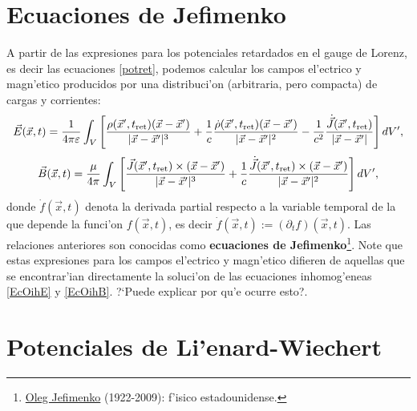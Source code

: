 \section{Ecuaciones de Jefimenko}
A partir de las expresiones para los potenciales retardados en el gauge de Lorenz, es decir las ecuaciones \eqref{potret}, podemos calcular los campos el'ectrico y magn'etico producidos por una distribuci'on (arbitraria, pero compacta) de cargas y corrientes:
\begin{equation}
\vec{E}(\vec{x},t)=\frac{1}{4\pi\varepsilon}\int_V \left[  \frac{\rho(\vec{x}',t_{\rm ret})(\vec{x}-\vec{x}')}{\vert \vec{x}-\vec{x}' \vert^3} + \frac{1}{c}\frac{ \dot\rho(\vec{x}',t_{\rm ret})(\vec{x}-\vec{x}')}{\vert\vec{x}-\vec{x}'\vert^2} -\frac{1}{c^2}\frac{\dot{\vec{J}} (\vec{x}',t_{\rm ret})}{\vert\vec{x}-\vec{x}' \vert} \right] dV',
\end{equation}
\begin{equation}
\vec{B}(\vec{x},t)=\frac{\mu}{4\pi} \int_V\left[
\frac{\vec{J}(\vec{x}',t_{\rm ret})\times(\vec{x}-\vec{x}')}{\vert \vec{x}-\vec{x}'\vert^3}+ \frac{1}{c}\frac{ \dot{\vec{J}}(\vec{x}',t_{\rm ret})\times(\vec{x}-\vec{x}')}{\vert\vec{x}-\vec{x}' \vert^2} \right]dV', \label{b3}
\end{equation}
donde $\dot{f}(\vec{x},t)$ denota la derivada partial respecto a la variable temporal de la que depende la funci'on $f(\vec{x},t)$, es decir $\dot{f}(\vec{x},t):=(\partial_t f)(\vec{x},t)$. Las relaciones anteriores son conocidas como \textbf{ecuaciones de Jefimenko}\footnote{\href{http://en.wikipedia.org/wiki/Jefimenko}{Oleg Jefimenko} (1922-2009): f'isico estadounidense.}. Note que estas expresiones para los campos el'ectrico y magn'etico difieren de aquellas que se encontrar'ian directamente la soluci'on de las ecuaciones inhomog'eneas \eqref{EcOihE} y \eqref{EcOihB}. ?`Puede explicar por qu'e ocurre esto?.


\section{Potenciales de Li'enard-Wiechert}

